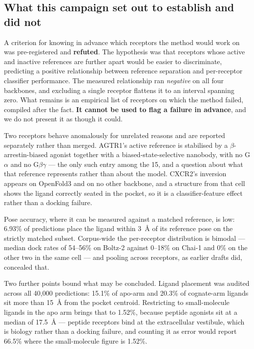 \subsection*{What this campaign set out to establish and did not}

A criterion for knowing in advance which receptors the method would work on was
pre-registered and \textbf{refuted}. The hypothesis was that receptors whose
active and inactive references are further apart would be easier to
discriminate, predicting a positive relationship between reference separation
and per-receptor classifier performance. The measured relationship ran
\emph{negative} on all four backbones, and excluding a single receptor
flattens it to an interval spanning zero. What remains is an empirical list of
receptors on which the method failed, compiled after the fact. \textbf{It
cannot be used to flag a failure in advance}, and we do not present it as
though it could.

Two receptors behave anomalously for unrelated reasons and are reported
separately rather than merged. AGTR1's active reference is stabilised by a
$\beta$-arrestin-biased agonist together with a biased-state-selective
nanobody, with no G$\alpha$ and no G$\beta\gamma$ --- the only such entry among
the 15, and a question about what that reference represents rather than about
the model. CXCR2's inversion appears on OpenFold3 and on no other backbone, and
a structure from that cell shows the ligand correctly seated in the pocket, so
it is a classifier-feature effect rather than a docking failure.

Pose accuracy, where it can be measured against a matched reference, is low:
6.93\% of predictions place the ligand within 3~\AA{} of its reference pose on
the strictly matched subset. Corpus-wide the per-receptor distribution is
bimodal --- median dock rates of 54--56\% on Boltz-2 against 0--18\% on Chai-1
and 0\% on the other two in the same cell --- and pooling across receptors, as
earlier drafts did, concealed that.

Two further points bound what may be concluded. Ligand placement was audited
across all 40{,}000 predictions: 15.1\% of apo-arm and 20.3\% of cognate-arm
ligands sit more than 15~\AA{} from the pocket centroid. Restricting to
small-molecule ligands in the apo arm brings that to 1.52\%, because peptide
agonists sit at a median of 17.5~\AA{} --- peptide receptors bind at the
extracellular vestibule, which is biology rather than a docking failure, and
counting it as error would report 66.5\% where the small-molecule figure is
1.52\%.

